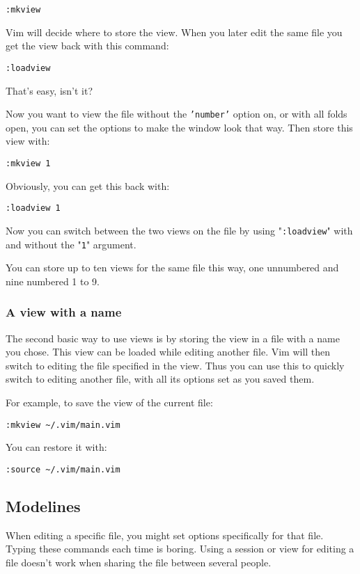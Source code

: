{\begin{Verbatim}[samepage=true]
 :mkview
\end{Verbatim}

Vim will decide where to store the view.
When you later edit the same file you get the view back with this command:

\begin{Verbatim}[samepage=true]
 :loadview
\end{Verbatim}

That's easy, isn't it?

Now you want to view the file without the \texttt{'number'} option on, or with all folds open, you can set the options to make the window look that way.
Then store this view with:

\begin{Verbatim}[samepage=true]
 :mkview 1
\end{Verbatim}

Obviously, you can get this back with:

\begin{Verbatim}[samepage=true]
 :loadview 1
\end{Verbatim}

Now you can switch between the two views on the file by using "\texttt{:loadview}" with and without the "\texttt{1}" argument.

You can store up to ten views for the same file this way, one unnumbered and nine numbered 1 to 9.
\subsubsection{A view with a name}
The second basic way to use views is by storing the view in a file with a name you chose.
This view can be loaded while editing another file.
Vim will then switch to editing the file specified in the view.
Thus you can use this to quickly switch to editing another file, with all its options set as you saved them.

For example, to save the view of the current file:

\begin{Verbatim}[samepage=true]
 :mkview ~/.vim/main.vim
\end{Verbatim}

You can restore it with:

\begin{Verbatim}[samepage=true]
 :source ~/.vim/main.vim
\end{Verbatim}
\subsection{Modelines}
When editing a specific file, you might set options specifically for that file.
Typing these commands each time is boring.
Using a session or view for editing a file doesn't work when sharing the file between several people.

}
